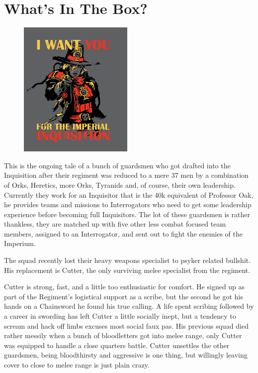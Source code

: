 \chapter{What's In The Box?}

\begin{figure}
	\begin{center}
		\includegraphics[width=\figwidth]{pics/4/1.png}
	\end{center}
\end{figure}
This is the ongoing tale of a bunch of guardsmen who got drafted into the Inquisition after their regiment was reduced to a mere 37 men by a combination of Orks, Heretics, more Orks, Tyranids and, of course, their own leadership. 
Currently they work for an Inquisitor that is the 40k equivalent of Professor Oak, he provides teams and missions to Interrogators who need to get some leadership experience before becoming full Inquisitors. 
The lot of these guardsmen is rather thankless, they are matched up with five other less combat focused team members, assigned to an Interrogator, and sent out to fight the enemies of the Imperium.

The squad recently lost their heavy weapons specialist to psyker related bullshit. 
His replacement is Cutter, the only surviving melee specialist from the regiment. 

Cutter is strong, fast, and a little too enthusiastic for comfort. 
He signed up as part of the Regiment's logistical support as a scribe, but the second he got his hands on a Chainsword he found his true calling. 
A life spent scribing followed by a career in swording has left Cutter a little socially inept, but a tendency to scream and hack off limbs excuses most social faux pas. 
His previous squad died rather messily when a bunch of bloodletters got into melee range, only Cutter was equipped to handle a close quarters battle. 
Cutter unsettles the other guardsmen, being bloodthirsty and aggressive is one thing, but willingly leaving cover to close to melee range is just plain crazy.


